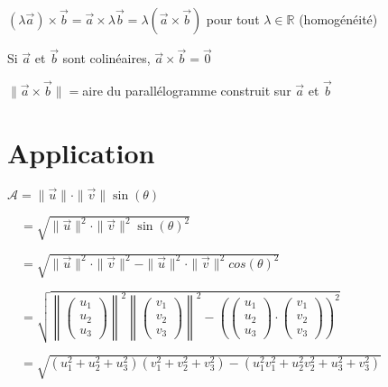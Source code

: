 \documentclass[12pt,a4paper]{report}
\newcommand*{\norme}[1]{\left\lVert{#1}\right\rVert}
\begin{document}
	$(\lambda\overrightarrow{a})\times\overrightarrow{b}=\overrightarrow{a}\times\lambda\overrightarrow{b}=\lambda(\overrightarrow{a}\times\overrightarrow{b})$ pour tout $\lambda \in \mathbb{R}$ (homogénéité)
	\smallskip
	
	Si $\overrightarrow{a}$ et $\overrightarrow{b}$ sont colinéaires, $\overrightarrow{a}\times\overrightarrow{b}=\overrightarrow{0}$
	\smallskip
	
	$\|\overrightarrow{a}\times\overrightarrow{b}\|=$aire du parallélogramme construit sur $\overrightarrow{a}$  et $\overrightarrow{b}$
	
	\section*{Application} 
	
	$ \mathcal{A} = \parallel \overrightarrow{u} \parallel \cdot \parallel \overrightarrow{v} \parallel \sin(\theta) $
	\medskip
	
	$\quad= \sqrt{ \parallel \overrightarrow{u} \parallel^2 \cdot \parallel \overrightarrow{v} \parallel^2 \sin(\theta)^2} $
	\medskip
	
	$\quad= \sqrt{ \parallel \overrightarrow{u} \parallel^2 \cdot \parallel \overrightarrow{v} \parallel^2 - \parallel \overrightarrow{u} \parallel^2 \cdot \parallel \overrightarrow{v} \parallel^2 cos(\theta)^2 } $
	\medskip
	
	$\quad= \sqrt{\norme{\left( \begin{array}{c}
		u_1 \\
		u_2 \\
		u_3
		\end{array} \right)}^2\norme{\left( \begin{array}{c}
		v_1 \\
		v_2 \\
		v_3
		\end{array} \right)}^2  - \left(\left( \begin{array}{c}
		u_1 \\
		u_2 \\
		u_3
		\end{array} \right) \cdot \left( \begin{array}{c}
		v_1 \\
		v_2 \\
		v_3
		\end{array} \right)\right)^2} $
	\medskip
	
	$\quad= \sqrt{(u_1^{2}+u_2^2+u_3^2)(v_1^2+v_2^2+v_3^2)-(u_1^2v_1^2+u_2^2v_2^2+u_3^2+v_3^2)} $
	\medskip
	
\end{document}
